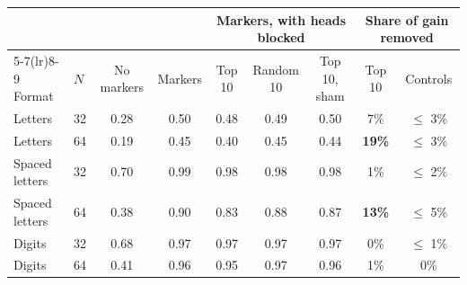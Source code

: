 \begin{tabular}{llccccccc}
\toprule
& & & & \multicolumn{3}{c}{Markers, with heads blocked} & \multicolumn{2}{c}{Share of gain removed} \\
\cmidrule(lr){5-7}\cmidrule(lr){8-9}
Format & $N$ & No markers & Markers & Top 10 & Random 10 & Top 10, sham & Top 10 & Controls \\
\midrule
Letters & 32 & 0.28 & 0.50 & 0.48 & 0.49 & 0.50 & 7\% & $\le$ 3\% \\
Letters & 64 & 0.19 & 0.45 & 0.40 & 0.45 & 0.44 & \textbf{19\%} & $\le$ 3\% \\
Spaced letters & 32 & 0.70 & 0.99 & 0.98 & 0.98 & 0.98 & 1\% & $\le$ 2\% \\
Spaced letters & 64 & 0.38 & 0.90 & 0.83 & 0.88 & 0.87 & \textbf{13\%} & $\le$ 5\% \\
Digits & 32 & 0.68 & 0.97 & 0.97 & 0.97 & 0.97 & 0\% & $\le$ 1\% \\
Digits & 64 & 0.41 & 0.96 & 0.95 & 0.97 & 0.96 & 1\% & 0\% \\
\bottomrule
\end{tabular}
